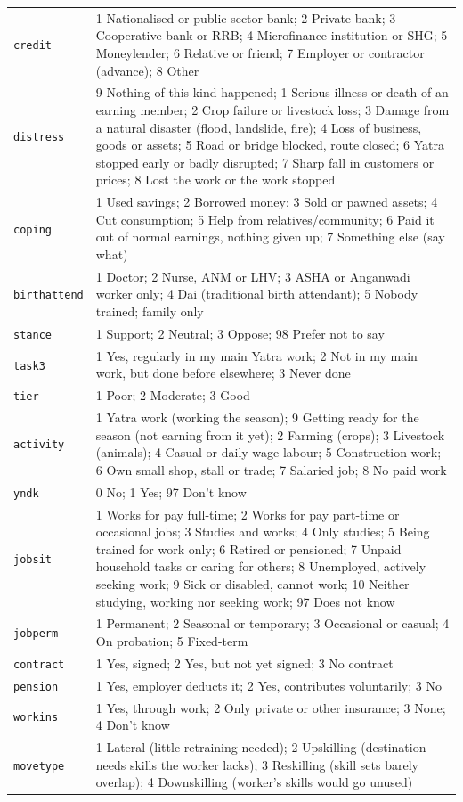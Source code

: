 \documentclass[10pt]{article}
\begin{document}
{\begin{longtable}{p{2cm}p{14cm}}
\texttt{credit} & 1 Nationalised or public-sector bank; 2 Private bank; 3 Cooperative bank or RRB; 4 Microfinance institution or SHG; 5 Moneylender; 6 Relative or friend; 7 Employer or contractor (advance); 8 Other \\
\texttt{distress} & 9 Nothing of this kind happened; 1 Serious illness or death of an earning member; 2 Crop failure or livestock loss; 3 Damage from a natural disaster (flood, landslide, fire); 4 Loss of business, goods or assets; 5 Road or bridge blocked, route closed; 6 Yatra stopped early or badly disrupted; 7 Sharp fall in customers or prices; 8 Lost the work or the work stopped \\
\texttt{coping} & 1 Used savings; 2 Borrowed money; 3 Sold or pawned assets; 4 Cut consumption; 5 Help from relatives/community; 6 Paid it out of normal earnings, nothing given up; 7 Something else (say what) \\
\texttt{birthattend} & 1 Doctor; 2 Nurse, ANM or LHV; 3 ASHA or Anganwadi worker only; 4 Dai (traditional birth attendant); 5 Nobody trained; family only \\
\texttt{stance} & 1 Support; 2 Neutral; 3 Oppose; 98 Prefer not to say \\
\texttt{task3} & 1 Yes, regularly in my main Yatra work; 2 Not in my main work, but done before elsewhere; 3 Never done \\
\texttt{tier} & 1 Poor; 2 Moderate; 3 Good \\
\texttt{activity} & 1 Yatra work (working the season); 9 Getting ready for the season (not earning from it yet); 2 Farming (crops); 3 Livestock (animals); 4 Casual or daily wage labour; 5 Construction work; 6 Own small shop, stall or trade; 7 Salaried job; 8 No paid work \\
\texttt{yndk} & 0 No; 1 Yes; 97 Don't know \\
\texttt{jobsit} & 1 Works for pay full-time; 2 Works for pay part-time or occasional jobs; 3 Studies and works; 4 Only studies; 5 Being trained for work only; 6 Retired or pensioned; 7 Unpaid household tasks or caring for others; 8 Unemployed, actively seeking work; 9 Sick or disabled, cannot work; 10 Neither studying, working nor seeking work; 97 Does not know \\
\texttt{jobperm} & 1 Permanent; 2 Seasonal or temporary; 3 Occasional or casual; 4 On probation; 5 Fixed-term \\
\texttt{contract} & 1 Yes, signed; 2 Yes, but not yet signed; 3 No contract \\
\texttt{pension} & 1 Yes, employer deducts it; 2 Yes, contributes voluntarily; 3 No \\
\texttt{workins} & 1 Yes, through work; 2 Only private or other insurance; 3 None; 4 Don't know \\
\texttt{movetype} & 1 Lateral (little retraining needed); 2 Upskilling (destination needs skills the worker lacks); 3 Reskilling (skill sets barely overlap); 4 Downskilling (worker's skills would go unused) \\
\bottomrule
\end{longtable}
}
\end{document}
